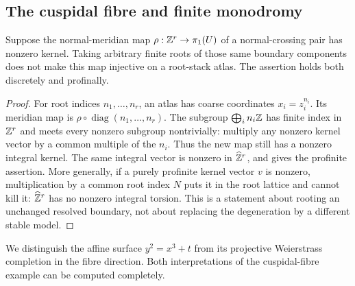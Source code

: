 \subsection{The cuspidal fibre and finite monodromy}
\label{sec:cusp}

\begin{proposition}\label{P1e-roots}
Suppose the normal-meridian map $\rho:\mathbb Z^r\to\pi _1(U)$ of a
normal-crossing pair has nonzero kernel. Taking arbitrary finite roots
of those same boundary components does not make this map injective
on a root-stack atlas. The assertion holds both discretely and
profinally.
\end{proposition}
\begin{proof}
For root indices $n_1,\ldots,n_r$, an atlas has coarse coordinates
$x_i=z_i^{n_i}$. Its meridian map is
$\rho\circ\operatorname{diag}(n_1,\ldots,n_r)$. The subgroup
$\bigoplus_i n_i\mathbb Z$ has finite index in $\mathbb Z^r$ and meets every
nonzero subgroup nontrivially: multiply any nonzero kernel vector
by a common multiple of the $n_i$. Thus the new map still has a
nonzero integral kernel. The same integral vector is nonzero in
$\widehat{\mathbb Z}^r$, and gives the profinite assertion. More generally,
if a purely profinite kernel vector $v$ is nonzero, multiplication
by a common root index $N$ puts it in the root lattice and cannot
kill it: $\widehat{\mathbb Z}^r$ has no nonzero integral torsion. This is a statement
about rooting an unchanged resolved boundary, not about replacing
the degeneration by a different stable model.
\end{proof}

We distinguish the affine surface $y^2=x^3+t$ from its projective
Weierstrass completion in the fibre direction. Both interpretations
of the cuspidal-fibre example can be computed completely.

